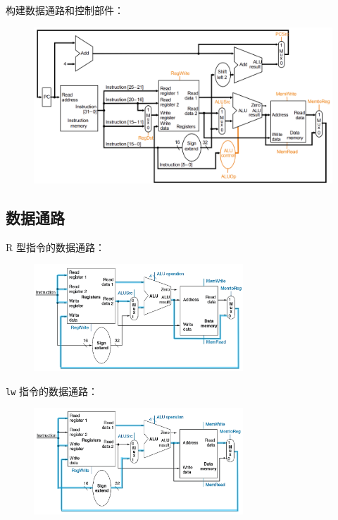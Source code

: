 \documentclass[cn, hazy, blue, normal, 12pt]{elegantnote}
\begin{document}
构建数据通路和控制部件：

\begin{figure}[h]
    \centering
    \includegraphics[width=\textwidth]{./images/Implementation.png}
\end{figure}

\subsection{数据通路}

R 型指令的数据通路：

\begin{figure}[h]
    \centering
    \includegraphics[width=0.7\textwidth]{./images/DATAPATH_R.png}
\end{figure}

\lstinline{lw} 指令的数据通路：

\begin{figure}[h]
    \centering
    \includegraphics[width=0.7\textwidth]{./images/DATAPATH_LW.png}
\end{figure}
\end{document}
